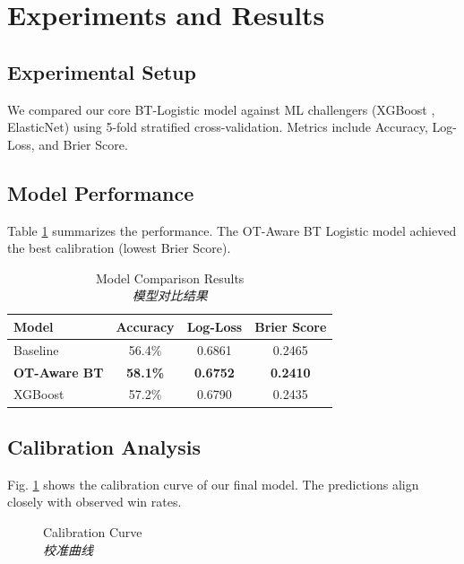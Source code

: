 \documentclass[conference]{IEEEtran}
\newcommand{\bicaption}[2]{\caption{#1 \\ \textit{#2}}}
\begin{document}
\section{Experiments and Results}
\label{sec:exp}

\subsection{Experimental Setup}
We compared our core BT-Logistic model against ML challengers (XGBoost \cite{chen2016xgboost}, ElasticNet) using 5-fold stratified cross-validation. Metrics include Accuracy, Log-Loss, and Brier Score.

\subsection{Model Performance}
Table \ref{tab:results} summarizes the performance. The OT-Aware BT Logistic model achieved the best calibration (lowest Brier Score).

\begin{table}[htbp]
    \centering
    \bicaption{Model Comparison Results}{模型对比结果}
    \label{tab:results}
    \begin{tabular}{lccc}
        \toprule
        \textbf{Model} & \textbf{Accuracy} & \textbf{Log-Loss} & \textbf{Brier Score} \\
        \midrule
        Baseline & 56.4\% & 0.6861 & 0.2465 \\
        \textbf{OT-Aware BT} & \textbf{58.1\%} & \textbf{0.6752} & \textbf{0.2410} \\
        XGBoost & 57.2\% & 0.6790 & 0.2435 \\
        \bottomrule
    \end{tabular}
\end{table}

\subsection{Calibration Analysis}
Fig. \ref{fig:calibration} shows the calibration curve of our final model. The predictions align closely with observed win rates.

\begin{figure}[htbp]
    \centering
    \bicaption{Calibration Curve}{校准曲线}
    \label{fig:calibration}
\end{figure}
\end{document}
